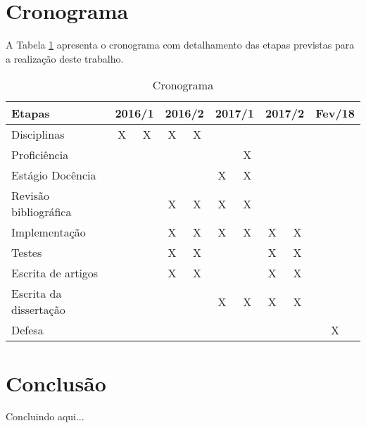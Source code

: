 \documentclass{ppgeesa}
\begin{document}
\section{Cronograma}
A  Tabela  \ref{tb:cronograma}  apresenta  o  cronograma  com  detalhamento das etapas previstas para a realização deste trabalho.
\begin{table}[!htpb]
\centering
\caption{Cronograma}
\label{tb:cronograma}
\begin{tabular}{|l|c|c|c|c|c|c|c|c|c|}
\hline
\textbf{Etapas} & \multicolumn{2}{l|}{\textbf{2016/1}} & \multicolumn{2}{l|}{\textbf{2016/2}} & \multicolumn{2}{l|}{\textbf{2017/1}} & \multicolumn{2}{l|}{\textbf{2017/2}} & \multicolumn{1}{l|}{\textbf{Fev/18}} \\ \hline
Disciplinas & X & X & X & X &  &  &  &  &  \\ \hline
Proficiência &  &  &  &  &  & X &  &  &  \\ \hline
Estágio Docência &  &  &  &  & X & X &  &  &  \\ \hline
Revisão bibliográfica &  &  & X & X & X & X &  &  &  \\ \hline
Implementação &  &  & X & X & X & X & X & X &  \\ \hline
Testes &  &  & X & X &  &  & X & X &  \\ \hline
Escrita de artigos &  &  & X & X &  &  & X & X  &  \\ \hline
Escrita da dissertação &  &  &  &  & X & X & X & X &  \\ \hline
Defesa &  &  &  &  &  &  &  &  & X \\ \hline
\end{tabular}
\end{table}

\section{Conclusão}
Concluindo aqui...



\end{document}
